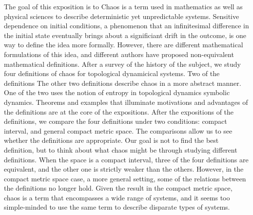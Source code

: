 \documentclass[12pt,twoside,draft]{book}
\begin{document}
The goal of this exposition is to 
Chaos is a term used in mathematics as well as physical sciences to describe deterministic yet unpredictable systems.
Sensitive dependence on initial conditions, a phenomenon that an infinitesimal difference in the initial state eventually brings about a significiant drift in the outcome, is one way to define the idea more formally.
However, there are different mathematical formulations of this idea, and different authors have proposed non-equivalent mathematical definitions.
After a survey of the history of the subject, we study four definitions of chaos for topological dynamicical systems.
Two of the definitions
The other two definitions describe chaos in a more abstract manner. 
One of the two uses the notion of entropy in topological dynamics
symbolic dynamics.
Theorems and examples that illuminate motivations and advantages of the definitions are at the core of the expositions.
After the expositions of the definitions, we compare the four definitions under two conditions: compact interval, and general compact metric space.
The comparisons allow us to see whether the definitions are appropriate.
Our goal is not to find the best definition, but to think about what chaos might be through studying different definitions.
When the space is a compact interval, three of the four definitions are equivalent, and the other one is strictly weaker than the others.
However, in the compact metric space case, a more general setting, some of the relations between the definitions no longer hold.
Given the result in the compact metric space, chaos is a term that encompasses a wide range of systems, and it seems too simple-minded to use the same term to describe disparate types of systems.



\end{document}
